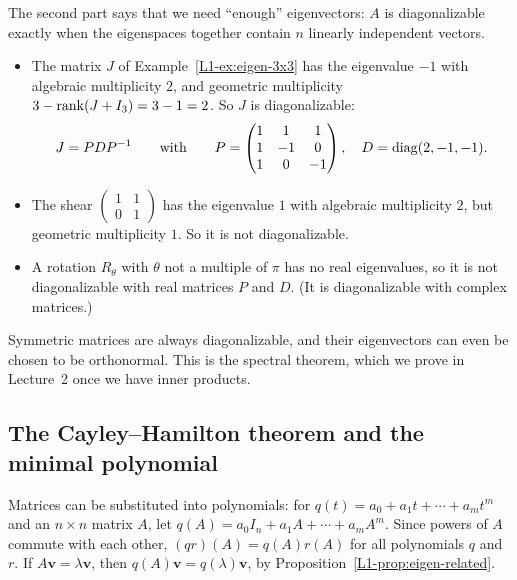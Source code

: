 The second part says that we need ``enough'' eigenvectors: $A$ is diagonalizable exactly when the eigenspaces together contain $n$ linearly independent vectors.

\begin{example}
    \begin{itemize}
        \item The matrix $J$ of Example~\ref{L1-ex:eigen-3x3} has the eigenvalue $-1$ with algebraic multiplicity $2$, and geometric multiplicity $3 - \operatorname{rank}(J + I_3) = 3 - 1 = 2$. So $J$ is diagonalizable:
        \[J = PDP^{-1} \qquad \text{with} \qquad P = \begin{pmatrix} 1 & 1 & 1 \\ 1 & -1 & 0 \\ 1 & 0 & -1 \end{pmatrix}, \quad D = \operatorname{diag}(2, -1, -1).\]
        \item The shear $\begin{pmatrix} 1 & 1 \\ 0 & 1 \end{pmatrix}$ has the eigenvalue $1$ with algebraic multiplicity $2$, but geometric multiplicity $1$. So it is not diagonalizable.
        \item A rotation $R_\theta$ with $\theta$ not a multiple of $\pi$ has no real eigenvalues, so it is not diagonalizable with real matrices $P$ and $D$. (It is diagonalizable with complex matrices.)
    \end{itemize}
\end{example}

\begin{remark}
    Symmetric matrices are always diagonalizable, and their eigenvectors can even be chosen to be orthonormal. This is the spectral theorem, which we prove in Lecture~2 once we have inner products.
\end{remark}

\subsection{The Cayley--Hamilton theorem and the minimal polynomial}\label{L1-subsec:cayley-hamilton}

Matrices can be substituted into polynomials: for $q(t) = a_0 + a_1t + \cdots + a_mt^m$ and an $n \times n$ matrix $A$, let $q(A) = a_0I_n + a_1A + \cdots + a_mA^m$. Since powers of $A$ commute with each other, $(qr)(A) = q(A)r(A)$ for all polynomials $q$ and $r$. If $A\mathbf{v} = \lambda\mathbf{v}$, then $q(A)\mathbf{v} = q(\lambda)\mathbf{v}$, by Proposition~\ref{L1-prop:eigen-related}.

